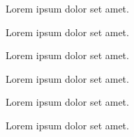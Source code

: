 \documentclass[10pt,a4paper,ngerman]{article}
\author{Max Mustermann, Maria Musterfrau}
\date{01.01.1970}
\begin{document}
    \maketitle

    Lorem ipsum dolor set amet.

    Lorem ipsum dolor set amet.

    Lorem ipsum dolor set amet.

    \ex
    Lorem ipsum dolor set amet.

    \subex
    Lorem ipsum dolor set amet.

    \subsubex
    Lorem ipsum dolor set amet.
    
\end{document}
